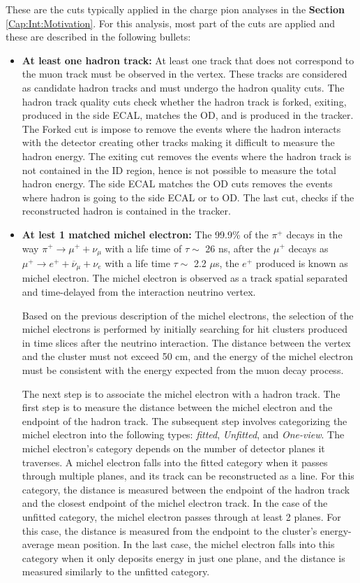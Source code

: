 These are the cuts typically applied in the charge pion analyses in the \textbf{Section} \ref{Cap:Int:Motivation}. For this analysis, most part of the cuts are applied and these are described in the following bullets: 

\begin{itemize}
    \item \textbf{At least one hadron track:} At least one track that does not correspond to the muon track must be observed in the vertex. These tracks are considered as candidate hadron tracks and must undergo the hadron quality cuts. The hadron track quality cuts check whether the hadron track is forked, exiting, produced in the side ECAL, matches the OD, and is produced in the tracker. The Forked cut is impose to remove the events where the hadron interacts with the detector creating other tracks making it difficult to measure the hadron energy. The exiting cut removes the events where the hadron track is not contained in the ID region, hence is not possible to measure the total hadron energy. The side ECAL matches the OD cuts removes the events where hadron is going to the side ECAL or to OD. The last cut, checks if the reconstructed hadron is contained in the tracker.
    \item \textbf{At lest 1 matched michel electron:} The 99.9\% of the $\pi^+$ decays in the way $\pi^+\xrightarrow{}\mu^+ + \nu_\mu$ with a life time of $\tau \sim$ 26 ns, after the $\mu^+$ decays as $\mu^+\xrightarrow{} e^+ + \overline{\nu}_\mu + \nu_e$ with a life time $\tau\sim$ 2.2 \(\mu\)s, the $e^+$ produced is known as michel electron. The michel electron is observed as a track spatial separated and time-delayed from the interaction neutrino vertex. 

    Based on the previous description of the michel electrons, the selection of the michel electrons is performed by initially searching for hit clusters produced in time slices after the neutrino interaction. The distance between the vertex and the cluster must not exceed 50 cm, and the energy of the michel electron must be consistent with the energy expected from the muon decay process.  

    The next step is to associate the michel electron with a hadron track. The first step is to measure the distance between the michel electron and the endpoint of the hadron track. The subsequent step involves categorizing the michel electron into the following types: \textit{fitted}, \textit{Unfitted}, and \textit{One-view}. The michel electron's category depends on the number of detector planes it traverses. A michel electron falls into the fitted category when it passes through multiple planes, and its track can be reconstructed as a line. For this category, the distance is measured between the endpoint of the hadron track and the closest endpoint of the michel electron track. In the case of the unfitted category, the michel electron passes through at least 2 planes. For this case, the distance is measured from the endpoint to the cluster's energy-average mean position. In the last case, the michel electron falls into this category when it only deposits energy in just one plane, and the distance is measured similarly to the unfitted category. 


\end{itemize}
